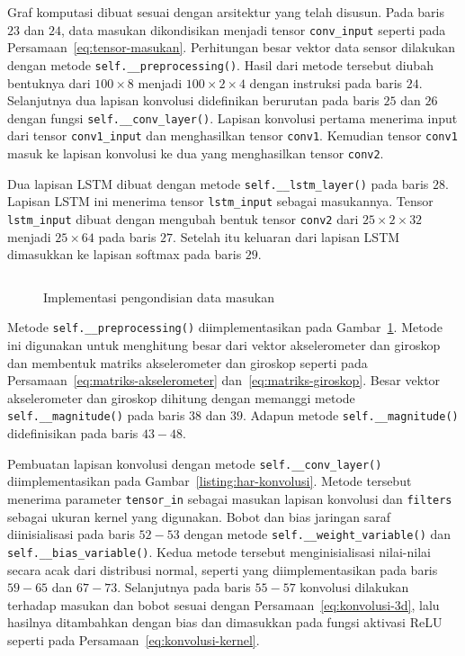 Graf komputasi dibuat sesuai dengan arsitektur yang telah disusun. Pada baris $23$ dan $24$, data masukan dikondisikan menjadi tensor \texttt{conv_input} seperti pada Persamaan~\ref{eq:tensor-masukan}. Perhitungan besar vektor data sensor dilakukan dengan metode \texttt{self.__preprocessing()}. Hasil dari metode tersebut diubah bentuknya dari $100 \times 8$ menjadi $100 \times 2 \times 4$ dengan instruksi pada baris $24$. Selanjutnya dua lapisan konvolusi didefinikan berurutan pada baris $25$ dan $26$ dengan fungsi \texttt{self.__conv_layer()}. Lapisan konvolusi pertama menerima input dari tensor \texttt{conv1_input} dan menghasilkan tensor \texttt{conv1}. Kemudian tensor \texttt{conv1} masuk ke lapisan konvolusi ke dua yang menghasilkan tensor \texttt{conv2}.

Dua lapisan LSTM dibuat dengan metode \texttt{self.__lstm_layer()} pada baris $28$. Lapisan LSTM ini menerima tensor \texttt{lstm_input} sebagai masukannya. Tensor \texttt{lstm_input} dibuat dengan mengubah bentuk tensor \texttt{conv2} dari $25 \times 2 \times 32$ menjadi $25 \times 64$ pada baris $27$. Setelah itu keluaran dari lapisan LSTM dimasukkan ke lapisan softmax pada baris $29$.

\begin{figure}[h]
    \inputminted[firstline=32,firstnumber=32,lastline=48,gobble=4]{python}{../har/har.py}
    \caption{Implementasi pengondisian data masukan}
    \label{listing:har-masukan}
\end{figure}

Metode \texttt{self.__preprocessing()} diimplementasikan pada Gambar~\ref{listing:har-masukan}. Metode ini digunakan untuk menghitung besar dari vektor akselerometer dan giroskop dan membentuk matriks akselerometer dan giroskop seperti pada Persamaan~\ref{eq:matriks-akselerometer} dan~\ref{eq:matriks-giroskop}. Besar vektor akselerometer dan giroskop dihitung dengan memanggi metode \texttt{self.__magnitude()} pada baris $38$ dan $39$. Adapun metode \texttt{self.__magnitude()} didefinisikan pada baris $43 - 48$.

Pembuatan lapisan konvolusi dengan metode \texttt{self.__conv_layer()} diimplementasikan pada Gambar~\ref{listing:har-konvolusi}. Metode tersebut menerima parameter \texttt{tensor_in} sebagai masukan lapisan konvolusi dan \texttt{filters} sebagai ukuran kernel yang digunakan. Bobot dan bias jaringan saraf diinisialisasi pada baris $52 - 53$ dengan metode \texttt{self.__weight_variable()} dan \texttt{self.__bias_variable()}. Kedua metode tersebut menginisialisasi nilai-nilai secara acak dari distribusi normal, seperti yang diimplementasikan pada baris $59 - 65$ dan $67 - 73$. Selanjutnya pada baris $55 - 57$ konvolusi dilakukan terhadap masukan dan bobot sesuai dengan Persamaan~\ref{eq:konvolusi-3d}, lalu hasilnya ditambahkan dengan bias dan dimasukkan pada fungsi aktivasi ReLU seperti pada Persamaan~\ref{eq:konvolusi-kernel}.

